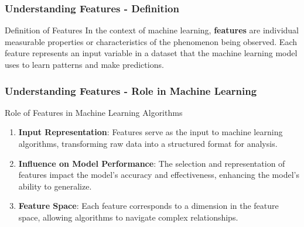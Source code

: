 \documentclass[aspectratio=169]{beamer}
\begin{document}
\begin{frame}[fragile]
    \frametitle{Understanding Features - Definition}
    \begin{block}{Definition of Features}
        In the context of machine learning, \textbf{features} are individual measurable properties or characteristics of the phenomenon being observed. Each feature represents an input variable in a dataset that the machine learning model uses to learn patterns and make predictions.
    \end{block}
\end{frame}

\begin{frame}[fragile]
    \frametitle{Understanding Features - Role in Machine Learning}
    \begin{block}{Role of Features in Machine Learning Algorithms}
        \begin{enumerate}
            \item \textbf{Input Representation}: Features serve as the input to machine learning algorithms, transforming raw data into a structured format for analysis.
            \item \textbf{Influence on Model Performance}: The selection and representation of features impact the model's accuracy and effectiveness, enhancing the model’s ability to generalize.
            \item \textbf{Feature Space}: Each feature corresponds to a dimension in the feature space, allowing algorithms to navigate complex relationships.
        \end{enumerate}
    \end{block}
\end{frame}
\end{document}
